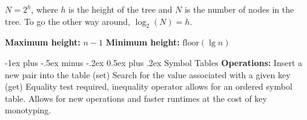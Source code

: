 \documentclass[letterpaper, 8pt]{extarticle}
\makeatletter
\renewcommand{\section}{\@startsection{section}{1}{0mm}%
                                {-1ex plus -.5ex minus -.2ex}%
                                {0.5ex plus .2ex}%
                                {\normalfont\normalsize\bfseries}}
\makeatother
\begin{document}
\begin{multicols*}{5}
  $N = 2^h$, where $h$ is the height of the tree and $N$ is the number of nodes in the tree.
  To go the other way around, $\log_2(N) = h$.

  \textbf{Maximum height:} $n - 1$
  \textbf{Minimum height:} $\text{floor}(\lg n)$


  \section{Symbol Tables}
  \textbf{Operations:}
  Insert a new pair into the table (set)
  Search for the value associated with a given key (get)
  Equality test required, inequality operator allows for an ordered symbol table.
  Allows for new operations and faster runtimes at the cost of key monotyping.


\end{multicols*}
\end{document}
